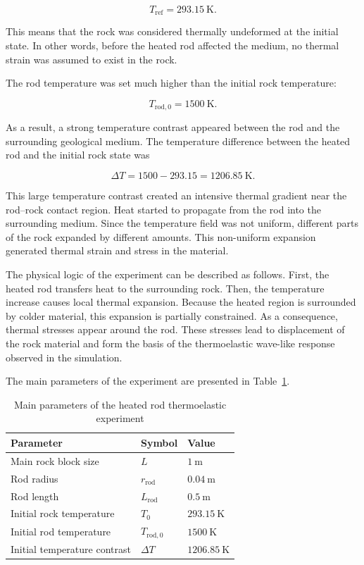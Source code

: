 \begin{equation}
T_{\mathrm{ref}} = 293.15~\mathrm{K}.
\end{equation}

This means that the rock was considered thermally undeformed at the initial state. In other words, before the heated rod affected the medium, no thermal strain was assumed to exist in the rock.

The rod temperature was set much higher than the initial rock temperature:

\begin{equation}
T_{\mathrm{rod},0} = 1500~\mathrm{K}.
\end{equation}

As a result, a strong temperature contrast appeared between the rod and the surrounding geological medium. The temperature difference between the heated rod and the initial rock state was

\begin{equation}
\Delta T = 1500 - 293.15 = 1206.85~\mathrm{K}.
\end{equation}

This large temperature contrast created an intensive thermal gradient near the rod--rock contact region. Heat started to propagate from the rod into the surrounding medium. Since the temperature field was not uniform, different parts of the rock expanded by different amounts. This non-uniform expansion generated thermal strain and stress in the material.

The physical logic of the experiment can be described as follows. First, the heated rod transfers heat to the surrounding rock. Then, the temperature increase causes local thermal expansion. Because the heated region is surrounded by colder material, this expansion is partially constrained. As a consequence, thermal stresses appear around the rod. These stresses lead to displacement of the rock material and form the basis of the thermoelastic wave-like response observed in the simulation.

The main parameters of the experiment are presented in Table~\ref{tab:heated_rod_experiment_parameters}.

\begin{table}[H]
\centering
\caption{Main parameters of the heated rod thermoelastic experiment}
\label{tab:heated_rod_experiment_parameters}
\begin{tabular}{p{} p{} p{}}
\hline
Parameter & Symbol & Value \\
\hline
Main rock block size & \(L\) & \(1~\mathrm{m}\) \\
Rod radius & \(r_{\mathrm{rod}}\) & \(0.04~\mathrm{m}\) \\
Rod length & \(L_{\mathrm{rod}}\) & \(0.5~\mathrm{m}\) \\
Initial rock temperature & \(T_0\) & \(293.15~\mathrm{K}\) \\
Initial rod temperature & \(T_{\mathrm{rod},0}\) & \(1500~\mathrm{K}\) \\
Initial temperature contrast & \(\Delta T\) & \(1206.85~\mathrm{K}\) \\
\hline
\end{tabular}
\end{table}

